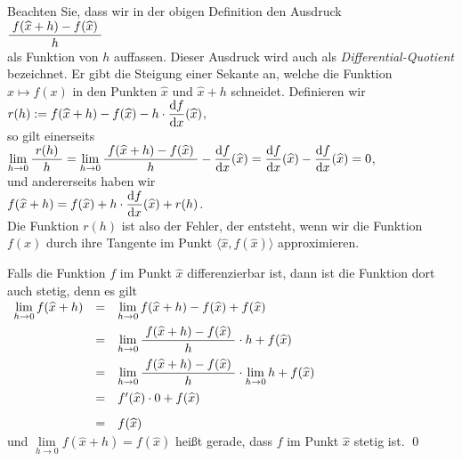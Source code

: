 \remark
Beachten Sie, dass wir in der obigen Definition den Ausdruck
\\[0.3cm]
\hspace*{1.3cm} $\displaystyle\frac{\;\displaystyle f(\widehat{x} + h) - f(\widehat{x})\;}{\;\displaystyle h\;}$ \\[0.3cm]
als Funktion von $h$ auffassen.  Dieser Ausdruck wird auch als \emph{Differential-Quotient}
bezeichnet.  Er gibt die Steigung einer Sekante an, welche die Funktion $x \mapsto f(x)$
in den Punkten $\widehat{x}$ und $\widehat{x} + h$ schneidet.  Definieren wir 
\\[0.3cm]
\hspace*{1.3cm}
$r(h) := f(\widehat{x} + h) - f(\widehat{x}) - h \cdot \displaystyle\frac{\textrm{d}f}{\textrm{d}x}(\widehat{x})$,
\\[0.3cm]
so gilt einerseits 
\\[0.3cm]
\hspace*{1.3cm}
$\lim\limits_{h \rightarrow 0} \displaystyle\frac{\;\displaystyle r(h)\;}{\;\displaystyle h\;} = 
 \lim\limits_{h \rightarrow 0} \displaystyle\frac{\;\displaystyle f(\widehat{x} + h) -
  f(\widehat{x})\;}{\;\displaystyle h\;} - \displaystyle\frac{\textrm{d}f}{\textrm{d}x}(\widehat{x}) = \displaystyle\frac{\textrm{d}f}{\textrm{d}x}(\widehat{x}) - \displaystyle\frac{\textrm{d}f}{\textrm{d}x}(\widehat{x}) = 0$,
\\[0.3cm]
und andererseits haben wir 
\\[0.3cm]
\hspace*{1.3cm}
$f(\widehat{x} + h) = f(\widehat{x}) + h \cdot \displaystyle\frac{\textrm{d}f}{\textrm{d}x}(\widehat{x}) + r(h)$.
\\[0.3cm]
Die Funktion $r(h)$ ist also der Fehler, der entsteht, wenn wir die Funktion $f(x)$ durch ihre
Tangente im Punkt $\bigl\langle\widehat{x}, f(\widehat{x})\bigr\rangle$ approximieren.  \eox


\remark
Falls die Funktion $f$ im Punkt $\widehat{x}$ differenzierbar ist,
dann ist die Funktion dort auch stetig, denn es gilt 
\\[0.3cm]
\hspace*{1.3cm}
$
\begin{array}[t]{lcl}
\lim\limits_{h \rightarrow 0} f(\widehat{x}+h) & = &
 \lim\limits_{h \rightarrow 0} f(\widehat{x}+h) - f(\widehat{x}) + f(\widehat{x}) \\[0.3cm]
& = & \lim\limits_{h \rightarrow 0} \displaystyle\frac{\;\displaystyle f(\widehat{x}+h) - f(\widehat{x})\;}{\;\displaystyle h\;} \cdot h + f(\widehat{x}) \\[0.3cm]
& = & \lim\limits_{h \rightarrow 0} \displaystyle\frac{\;\displaystyle f(\widehat{x}+h) - f(\widehat{x})\;}{\;\displaystyle h\;} \cdot \lim\limits_{h \rightarrow 0} h + f(\widehat{x}) \\[0.3cm]
& = & f'(\widehat{x}) \cdot 0 + f(\widehat{x}) \\[0.3cm]
& = & f(\widehat{x})
\end{array}
$
\\[0.3cm]
und $\lim\limits_{h \rightarrow 0} f(\widehat{x}+h) = f(\widehat{x})$ hei{\ss}t gerade, dass $f$
im Punkt $\widehat{x}$ stetig ist. \qed
\vspace*{0.3cm}

